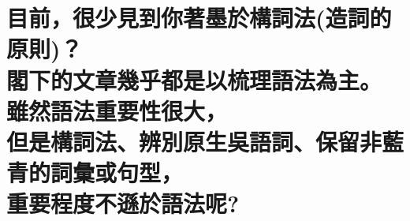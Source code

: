 %
% 

\chapter[目前，很少見到你著墨於構詞法(造詞的原則)？ 閣下的文章幾乎都是以梳理語法為主。 雖然語法重要性很大， 但是構詞法、辨別原生吳語詞、保留非藍青的詞彙或句型， 重要程度不遜於語法呢?]{目前，很少見到你著墨於構詞法(造詞的原則)？ \\[0.35em] 閣下的文章幾乎都是以梳理語法為主。 \\[0.35em] 雖然語法重要性很大， \\[0.35em] 但是構詞法、辨別原生吳語詞、保留非藍青的詞彙或句型， \\[0.35em] 重要程度不遜於語法呢?}

